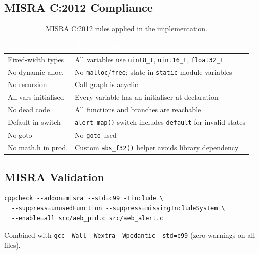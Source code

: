 \documentclass[12pt]{article}
\begin{document}
\subsection{MISRA C:2012 Compliance}

\begin{table}[H]
\centering
\caption{MISRA C:2012 rules applied in the implementation.}
\footnotesize
\begin{tabularx}{\textwidth}{|>{\raggedright\arraybackslash}p{2.5cm}
                              |>{\raggedright\arraybackslash}X|}
\hline
\rowcolor{sectionblue}
\textcolor{white}{\textbf{Rule}} &
\textcolor{white}{\textbf{How Applied}} \\ \hline

Fixed-width types & All variables use \texttt{uint8\_t}, \texttt{uint16\_t}, \texttt{float32\_t} \\ \hline
No dynamic alloc. & No \texttt{malloc}/\texttt{free}; state in \texttt{static} module variables \\ \hline
No recursion & Call graph is acyclic \\ \hline
All vars initialised & Every variable has an initialiser at declaration \\ \hline
No dead code & All functions and branches are reachable \\ \hline
Default in switch & \texttt{alert\_map()} switch includes \texttt{default} for invalid states \\ \hline
No goto & No \texttt{goto} used \\ \hline
No math.h in prod. & Custom \texttt{abs\_f32()} helper avoids library dependency \\ \hline

\end{tabularx}
\end{table}

\subsection{MISRA Validation}

\begin{lstlisting}[language={}, caption={MISRA validation via cppcheck.}]
cppcheck --addon=misra --std=c99 -Iinclude \
  --suppress=unusedFunction --suppress=missingIncludeSystem \
  --enable=all src/aeb_pid.c src/aeb_alert.c
\end{lstlisting}

Combined with \texttt{gcc -Wall -Wextra -Wpedantic -std=c99} (zero warnings on all files).
\end{document}
